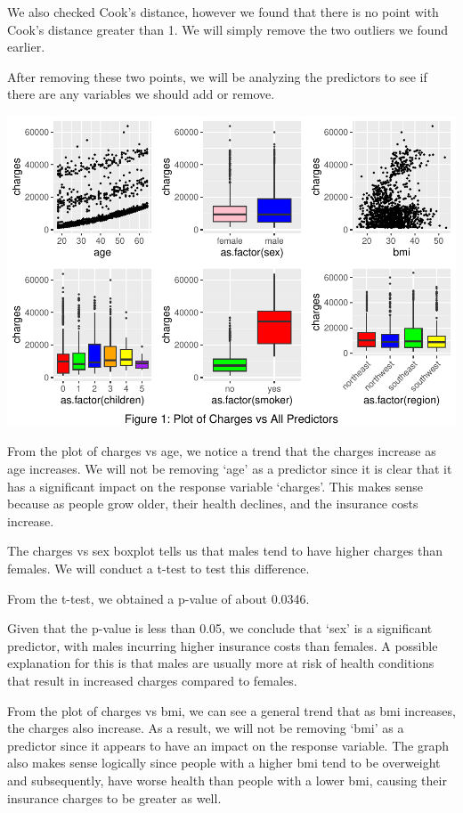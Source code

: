 \documentclass[
  12pt,
]{article}
\begin{document}
We also checked Cook's distance, however we found that there is no point
with Cook's distance greater than 1. We will simply remove the two
outliers we found earlier.

\newpage

After removing these two points, we will be analyzing the predictors to
see if there are any variables we should add or remove.

\includegraphics{finalproject_files/figure-latex/unnamed-chunk-7-1.pdf}

From the plot of charges vs age, we notice a trend that the charges
increase as age increases. We will not be removing `age' as a predictor
since it is clear that it has a significant impact on the response
variable `charges'. This makes sense because as people grow older, their
health declines, and the insurance costs increase.

The charges vs sex boxplot tells us that males tend to have higher
charges than females. We will conduct a t-test to test this difference.

From the t-test, we obtained a p-value of about 0.0346.

Given that the p-value is less than 0.05, we conclude that `sex' is a
significant predictor, with males incurring higher insurance costs than
females. A possible explanation for this is that males are usually more
at risk of health conditions that result in increased charges compared
to females.

From the plot of charges vs bmi, we can see a general trend that as bmi
increases, the charges also increase. As a result, we will not be
removing `bmi' as a predictor since it appears to have an impact on the
response variable. The graph also makes sense logically since people
with a higher bmi tend to be overweight and subsequently, have worse
health than people with a lower bmi, causing their insurance charges to
be greater as well.
\end{document}

